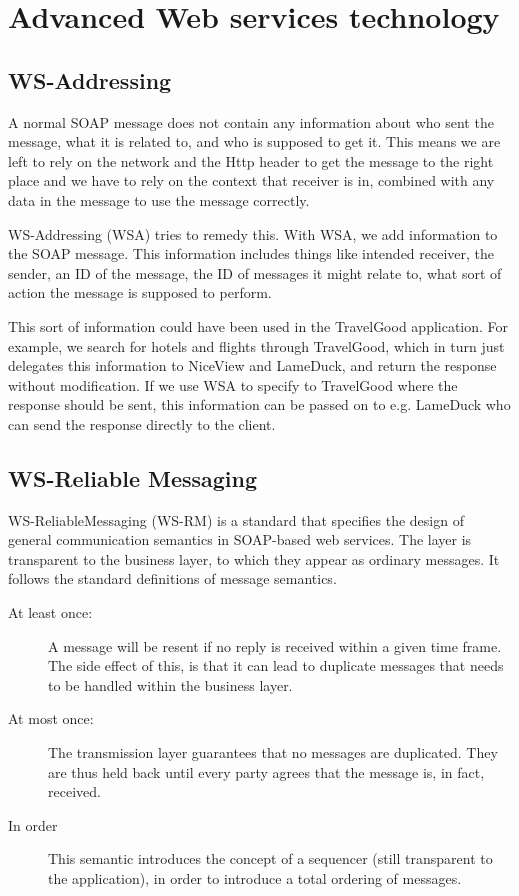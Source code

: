 \chapter{Advanced Web services technology}

\section{WS-Addressing}
A normal SOAP message does not contain any information about who sent the message, what it is related to, and who is supposed to get it. This means we are left to rely on the network and the Http header to get the message to the right place and we have to rely on the context that receiver is in, combined with any data in the message to use the message correctly.

WS-Addressing (WSA) tries to remedy this. With WSA, we add information to the SOAP message. This information includes things like intended receiver, the sender, an ID of the message, the ID of messages it might relate to, what sort of action the message is supposed to perform.

This sort of information could have been used in the TravelGood application. For example, we search for hotels and flights through TravelGood, which in turn just delegates this information to NiceView and LameDuck, and return the response without modification. If we use WSA to specify to TravelGood where the response should be sent, this information can be passed on to e.g. LameDuck who can send the response directly to the client.

\section{WS-Reliable Messaging}
WS-ReliableMessaging (WS-RM) is a standard  that specifies the design of general communication semantics in SOAP-based web services. The layer is transparent to the business layer, to which they appear as ordinary messages.
It follows the standard definitions of message semantics.
\begin{description}
\item[At least once:] A message will be resent if no reply is received within a given time frame. The side effect of this, is that it can lead to duplicate messages that needs to be handled within the business layer.
\item[At most once:] The transmission layer guarantees that no messages are duplicated. They are thus held back until every party agrees that the message is, in fact, received.
\item[In order] This semantic introduces the concept of a sequencer (still transparent to the application), in order to introduce a total ordering of messages.
\end{description}


